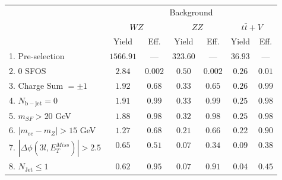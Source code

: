 \begin{tabular}{l||c|c||c|c||c|c}
\hline
 &  \multicolumn{6}{c}{Background} \\
 & \multicolumn{2}{c||}{$WZ$} & \multicolumn{2}{c||}{$ZZ$} & \multicolumn{2}{c}{$t\bar{t}+V$} \\ 
 & Yield & Eff. & Yield & Eff. & Yield & Eff. \\
\hline\hline
1. Pre-selection &  $1566.91$ & --- &  $323.60$ &  --- &  $36.93$ &  --- \\
\hline
2. 0 SFOS &  $2.84$ &  $0.002$ &  $0.50$ &  $0.002$ &  $0.26$ &  $0.01$ \\
\hline
3. Charge Sum $= \pm 1$ &  $1.92$ &  $0.68$ &  $0.33$ &  $0.65$ &  $0.26$ &  $0.99$ \\
\hline
4. $N_{\mathrm{b-jet}} = 0$ &  $1.91$ &  $0.99$ &  $0.33$ &  $0.99$ &  $0.25$ &  $0.98$ \\
\hline
5. $m_{SF} > 20$ GeV &  $1.88$ &  $0.98$ &  $0.32$ &  $0.98$ &  $0.25$ &  $0.98$ \\
\hline
6. $|m_{ee} - m_{Z}| > 15$ GeV &  $1.27$ &  $0.68$ &  $0.21$ &  $0.66$ &  $0.22$ &  $0.90$ \\
\hline
7. $|\Delta\phi(3l,E_{T}^{Miss})| > 2.5$ &  $0.65$ &  $0.51$ &  $0.07$ &  $0.34$ &  $0.09$ &  $0.38$ \\
\hline
8. $N_{\mathrm{Jet}} \leq 1$ &  $0.62$ &  $0.95$ &  $0.07$ &  $0.91$ &  $0.04$ &  $0.45$ \\
\hline
\end{tabular}



